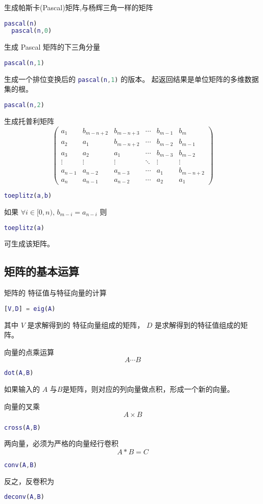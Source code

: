 \documentclass{ctexart}
\begin{document}
  生成帕斯卡(Pascal)矩阵,与杨辉三角一样的矩阵
  \begin{lstlisting}[language=matlab]
  pascal(n)
  pascal(n,0)
  \end{lstlisting}
  生成 Pascal 矩阵的下三角分量
  \begin{lstlisting}[language=matlab]
  pascal(n,1)
  \end{lstlisting}
  生成一个排位变换后的 \lstinline[language=matlab]|pascal(n,1)| 的版本。
  起返回结果是单位矩阵的多维数据集的根。
  \begin{lstlisting}[language=matlab]
  pascal(n,2)
  \end{lstlisting}

  生成托普利矩阵
  $$\left(\begin{array}{cccccc}
  a_1     & b_{m-n+2} & b_{m-n+3} & \cdots & b_{m-1} & b_m \\
  a_2     & a_1     & b_{m-n+2} & \cdots & b_{m-2} & b_{m-1}\\
  a_3     & a_2     & a_1     & \cdots & b_{m-3} & b_{m-2}\\
  \vdots  & \vdots  & \vdots  & \ddots & \vdots  & \vdots \\
  a_{n-1} & a_{n-2} & a_{n-3} & \cdots & a_1     & b_{m-n+2} \\
  a_n     & a_{n-1} & a_{n-2} & \cdots & a_2     & a_1
  \end{array}\right)$$
  \begin{lstlisting}[language=matlab]
  toeplitz(a,b)
  \end{lstlisting}
  如果 $\forall i \in [0,n) ,\, b_{m-i}=a_{n-i}$
  则
  \begin{lstlisting}[language=matlab]
  toeplitz(a)
  \end{lstlisting}
  可生成该矩阵。

  \subsection{矩阵的基本运算}
  \label{ssec:mat:bc}

  矩阵的 特征值与特征向量的计算
  \begin{lstlisting}[language=matlab]
  [V,D] = eig(A)
  \end{lstlisting}
  其中 $V$ 是求解得到的 特征向量组成的矩阵， $D$ 是求解得到的特征值组成的矩阵。

  向量的点乘运算
  $$A\cdots B$$
  \begin{lstlisting}[language=matlab]
  dot(A,B)
  \end{lstlisting}
  如果输入的 $A$ 与$B$是矩阵，则对应的列向量做点积，形成一个新的向量。

  向量的叉乘
  $$A \times B$$
  \begin{lstlisting}[language=matlab]
  cross(A,B)
  \end{lstlisting}

  两向量，必须为严格的向量经行卷积
  $$A*B=C$$
  \begin{lstlisting}[language=matlab]
  conv(A,B)
  \end{lstlisting}
  反之，反卷积为
  \begin{lstlisting}[language=matlab]
  deconv(A,B)
  \end{lstlisting}
\end{document}
